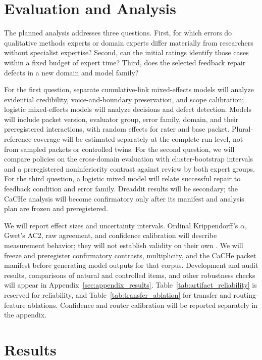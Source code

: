 \section{Evaluation and Analysis}

The planned analysis addresses three questions. First, for which errors do qualitative methods experts or domain experts differ materially from researchers without specialist expertise? Second, can the initial ratings identify those cases within a fixed budget of expert time? Third, does the selected feedback repair defects in a new domain and model family?

For the first question, separate cumulative-link mixed-effects models will analyze evidential credibility, voice-and-boundary preservation, and scope calibration; logistic mixed-effects models will analyze decisions and defect detection. Models will include packet version, evaluator group, error family, domain, and their preregistered interactions, with random effects for rater and base packet. Plural-reference coverage will be estimated separately at the complete-run level, not from sampled packets or controlled twins. For the second question, we will compare policies on the cross-domain evaluation with cluster-bootstrap intervals and a preregistered noninferiority contrast against review by both expert groups. For the third question, a logistic mixed model will relate successful repair to feedback condition and error family. Dreaddit results will be secondary; the CaCHe analysis will become confirmatory only after its manifest and analysis plan are frozen and preregistered.

We will report effect sizes and uncertainty intervals. Ordinal Krippendorff's $\alpha$, Gwet's AC2, raw agreement, and confidence calibration will describe measurement behavior; they will not establish validity on their own \citep{mcdonald2019reliability}. We will freeze and preregister confirmatory contrasts, multiplicity, and the CaCHe packet manifest before generating model outputs for that corpus. Development and audit results, comparisons of natural and controlled items, and other robustness checks will appear in Appendix~\ref{sec:appendix_results}. Table~\ref{tab:artifact_reliability} is reserved for reliability, and Table~\ref{tab:transfer_ablation} for transfer and routing-feature ablations. Confidence and router calibration will be reported separately in the appendix.

\section{Results}

